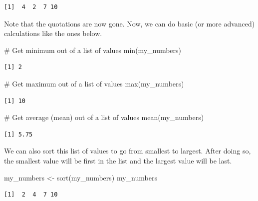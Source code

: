 \documentclass[
  letterpaper,
  DIV=11,
  numbers=noendperiod]{scrreprt}
\newenvironment{Shaded}{\begin{snugshade}}{\end{snugshade}}
\newcommand{\CommentTok}[1]{\textcolor[rgb]{0.37,0.37,0.37}{#1}}
\newcommand{\FunctionTok}[1]{\textcolor[rgb]{0.28,0.35,0.67}{#1}}
\newcommand{\NormalTok}[1]{\textcolor[rgb]{0.00,0.23,0.31}{#1}}
\newcommand{\OtherTok}[1]{\textcolor[rgb]{0.00,0.23,0.31}{#1}}
\begin{document}
\begin{verbatim}
[1]  4  2  7 10
\end{verbatim}

Note that the quotations are now gone. Now, we can do basic (or more
advanced) calculations like the ones below.

\begin{Shaded}
\begin{Highlighting}[]
\CommentTok{\# Get minimum out of a list of values}
\FunctionTok{min}\NormalTok{(my\_numbers)}
\end{Highlighting}
\end{Shaded}

\begin{verbatim}
[1] 2
\end{verbatim}

\begin{Shaded}
\begin{Highlighting}[]
\CommentTok{\# Get maximum out of a list of values}
\FunctionTok{max}\NormalTok{(my\_numbers)}
\end{Highlighting}
\end{Shaded}

\begin{verbatim}
[1] 10
\end{verbatim}

\begin{Shaded}
\begin{Highlighting}[]
\CommentTok{\# Get average (mean) out of a list of values}
\FunctionTok{mean}\NormalTok{(my\_numbers)}
\end{Highlighting}
\end{Shaded}

\begin{verbatim}
[1] 5.75
\end{verbatim}

We can also sort this list of values to go from smallest to largest.
After doing so, the smallest value will be first in the list and the
largest value will be last.

\begin{Shaded}
\begin{Highlighting}[]
\NormalTok{my\_numbers }\OtherTok{\textless{}{-}} \FunctionTok{sort}\NormalTok{(my\_numbers)}
\NormalTok{my\_numbers}
\end{Highlighting}
\end{Shaded}

\begin{verbatim}
[1]  2  4  7 10
\end{verbatim}
\end{document}
